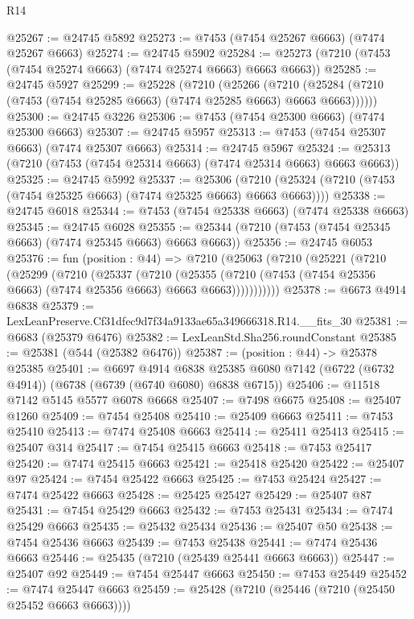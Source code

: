 \begin{lexlean}{R14}
\begin{coremodule}
@25267 := @24745 @5892
@25273 := @7453 (@7454 @25267 @6663) (@7474 @25267 @6663)
@25274 := @24745 @5902
@25284 := @25273 (@7210 (@7453 (@7454 @25274 @6663) (@7474 @25274 @6663) @6663 @6663))
@25285 := @24745 @5927
@25299 := @25228
    (@7210
      (@25266
        (@7210 (@25284 (@7210 (@7453 (@7454 @25285 @6663) (@7474 @25285 @6663) @6663 @6663))))))
@25300 := @24745 @3226
@25306 := @7453 (@7454 @25300 @6663) (@7474 @25300 @6663)
@25307 := @24745 @5957
@25313 := @7453 (@7454 @25307 @6663) (@7474 @25307 @6663)
@25314 := @24745 @5967
@25324 := @25313 (@7210 (@7453 (@7454 @25314 @6663) (@7474 @25314 @6663) @6663 @6663))
@25325 := @24745 @5992
@25337 := @25306
    (@7210 (@25324 (@7210 (@7453 (@7454 @25325 @6663) (@7474 @25325 @6663) @6663 @6663))))
@25338 := @24745 @6018
@25344 := @7453 (@7454 @25338 @6663) (@7474 @25338 @6663)
@25345 := @24745 @6028
@25355 := @25344 (@7210 (@7453 (@7454 @25345 @6663) (@7474 @25345 @6663) @6663 @6663))
@25356 := @24745 @6053
@25376 := fun (position : @44) =>
  @7210
    (@25063
      (@7210
        (@25221
          (@7210
            (@25299
              (@7210
                (@25337
                  (@7210
                    (@25355
                      (@7210 (@7453 (@7454 @25356 @6663) (@7474 @25356 @6663) @6663 @6663)))))))))))
@25378 := @6673 @4914 @6838
@25379 := LexLeanPreserve.Cf31dfec9d7f34a9133ae65a349666318.R14.__fits_30
@25381 := @6683 (@25379 @6476)
@25382 := LexLeanStd.Sha256.roundConstant
@25385 := @25381 (@544 (@25382 @6476))
@25387 := (position : @44) -> @25378 @25385
@25401 := @6697
    @4914
    @6838
    @25385
    @6080
    @7142
    (@6722 (@6732 @4914))
    (@6738 (@6739 (@6740 @6080) @6838 @6715))
@25406 := @11518 @7142 @5145 @5577 @6078 @6668
@25407 := @7498 @6675
@25408 := @25407 @1260
@25409 := @7454 @25408
@25410 := @25409 @6663
@25411 := @7453 @25410
@25413 := @7474 @25408 @6663
@25414 := @25411 @25413
@25415 := @25407 @314
@25417 := @7454 @25415 @6663
@25418 := @7453 @25417
@25420 := @7474 @25415 @6663
@25421 := @25418 @25420
@25422 := @25407 @97
@25424 := @7454 @25422 @6663
@25425 := @7453 @25424
@25427 := @7474 @25422 @6663
@25428 := @25425 @25427
@25429 := @25407 @87
@25431 := @7454 @25429 @6663
@25432 := @7453 @25431
@25434 := @7474 @25429 @6663
@25435 := @25432 @25434
@25436 := @25407 @50
@25438 := @7454 @25436 @6663
@25439 := @7453 @25438
@25441 := @7474 @25436 @6663
@25446 := @25435 (@7210 (@25439 @25441 @6663 @6663))
@25447 := @25407 @92
@25449 := @7454 @25447 @6663
@25450 := @7453 @25449
@25452 := @7474 @25447 @6663
@25459 := @25428 (@7210 (@25446 (@7210 (@25450 @25452 @6663 @6663))))

\end{coremodule}
\end{lexlean}
